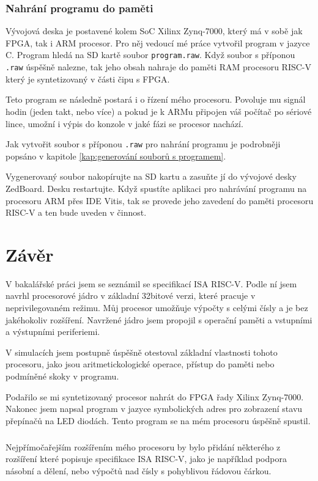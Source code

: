 \documentclass[FM,BP]{tulthesis}
\begin{document}
\subsection{Nahrání programu do paměti}
Vývojová deska je postavené kolem SoC Xilinx Zynq-7000, který má v sobě jak FPGA, tak i ARM procesor. Pro něj vedoucí mé práce vytvořil program v jazyce C. Program hledá na SD kartě soubor \verb|program.raw|. Když soubor s příponou \verb|.raw| úspěšně nalezne, tak jeho obsah nahraje do paměti RAM procesoru RISC-V který je syntetizovaný v části čipu s FPGA. 

Teto program se následně postará i o řízení mého procesoru. Povoluje mu signál hodin (jeden takt, nebo více) a pokud je k ARMu připojen váš počítač po sériové lince, umožní i výpis do konzole v jaké fázi se procesor nachází. 

Jak vytvořit soubor s příponou \verb|.raw| pro nahrání programu je podrobněji popsáno v kapitole \ref{kap:generování souborů s programem}.

Vygenerovaný soubor nakopírujte na SD kartu a zasuňte jí do vývojové desky ZedBoard. Desku restartujte. Když spustíte aplikaci pro nahrávání programu na procesoru ARM přes IDE Vitis, tak se provede jeho zavedení do paměti procesoru RISC-V a ten bude uveden v činnost. 

\chapter{Závěr}
V bakalářské práci jsem se seznámil se specifikací ISA RISC-V. Podle ní jsem navrhl procesorové jádro v základní 32bitové verzi, které pracuje v neprivilegovaném režimu. Můj procesor umožňuje výpočty s celými čísly a je bez jakéhokoliv rozšíření. Navržené jádro jsem propojil s operační paměti a vstupními a výstupními periferiemi. 

V simulacích jsem postupně úspěšně otestoval základní vlastnosti tohoto procesoru, jako jsou aritmetickologické operace, přístup do paměti nebo podmíněné skoky v programu. 

Podařilo se mi syntetizovaný procesor nahrát do FPGA řady Xilinx Zynq-7000. Nakonec jsem napsal program v jazyce symbolických adres pro zobrazení stavu přepínačů na LED diodách. Tento program se na mém procesoru úspěšně spustil.

\paragraph{}
Nejpřímočařejším rozšířením mého procesoru by bylo přidání některého z rozšíření které popisuje specifikace ISA RISC-V, jako je například podpora násobní a dělení, nebo výpočtů nad čísly s pohyblivou řádovou čárkou. 
\end{document}
